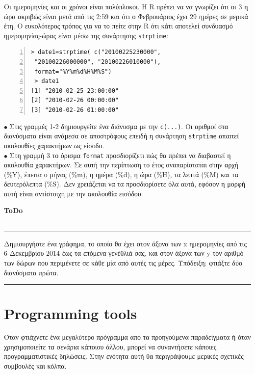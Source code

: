 \documentclass[a4paper,11pt,twocolumn,tablecaptionabove]{scrartcl}
\newenvironment{ToDo} {%
  \begin{flushright}
    \hfill
    \begin{minipage}{0.95\columnwidth}         %
    \textsf{\textbf{ToDo}} \\
      \vspace{-0.85cm}\\
      {\color{Gray}\rule[-0.1cm]{\columnwidth}{1.5pt}}} { %
      {\color{Gray} \rule[0.3cm]{\columnwidth}{1.5pt}}
    \end{minipage}
    \vspace{1em}
  \end{flushright}
  }
\begin{document}
Οι ημερομηνίες και οι χρόνοι είναι πολύπλοκοι. Η R πρέπει να να γνωρίζει ότι οι 3 η ώρα ακριβώς είναι μετά από
τις 2:59 και ότι ο Φεβρουάριος έχει 29 ημέρες σε μερικά έτη. Ο ευκολότερος τρόπος για να το πείτε στην R ότι κάτι αποτελεί συνδυασμό ημερομηνίας-ώρας είναι μέσω της συνάρτησης \texttt{strptime}:

\begin{Verbatim}[frame=single,numbers=left,gobble=0, xleftmargin=0.35cm, numbersep=0.1cm]
> date1=strptime( c("20100225230000", 
 "20100226000000", "20100226010000"), 
 format="%Y%m%d%H%M%S")
 > date1
[1] "2010-02-25 23:00:00" 
[2] "2010-02-26 00:00:00" 
[3] "2010-02-26 01:00:00"
\end{Verbatim}

\noindent $\bullet$  Στις γραμμές 1-2 δημιουργείτε ένα διάνυσμα με την \texttt{c(...)}. Οι αριθμοί στα 
διανύσματα είναι ανάμεσα σε αποστρόφους επειδή η συνάρτηση \texttt{strptime} απαιτεί ακολουθίες χαρακτήρων ως
είσοδο.\\
\noindent $\bullet$ Στη γραμμή 3 το όρισμα \texttt{format} προσδιορίζετι πώς θα πρέπει να διαβαστεί η ακολουθία
χαρακτήρων. Σε αυτή την περίπτωση το έτος αναπαρίσταται στην αρχή (\%Y), έπειτα ο μήνας (\%m), η ημέρα (\%d),
η ώρα (\%H), τα λεπτά (\%M) και τα δευτερόλεπτα (\%S). Δεν χρειάζεται να τα προσδιορίσετε όλα αυτά, εφόσον η
μορφή αυτή είναι αντίστοιχη με την ακολουθία εισόδου.

\begin{ToDo}
Δημιουργήστε ένα γράφημα, το οποίο θα έχει στον άξονα των x ημερομηνίες από τις 6 Δεκεμβρίου 2014 έως τα επόμενα 
γενέθλιά σας, και στον άξονα των y τον αριθμό των δώρων που περιμένετε σε κάθε μία από αυτές τις μέρες.
Υπόδειξη: φτιάξτε δύο διανύσματα πρώτα.
\end{ToDo}

\section{Programming tools}

Όταν φτιάχνετε ένα μεγαλύτερο πρόγραμμα από τα προηγούμενα παραδείγματα ή όταν χρησιμοποιείτε τα σενάρια κάποιου
άλλου, μπορεί να συναντήσετε κάποιες προγραμματιστικές  δηλώσεις. Στην ενότητα αυτή θα περιγράψουμε μερικές
σχετικές συμβουλές και κόλπα.


\end{document}
